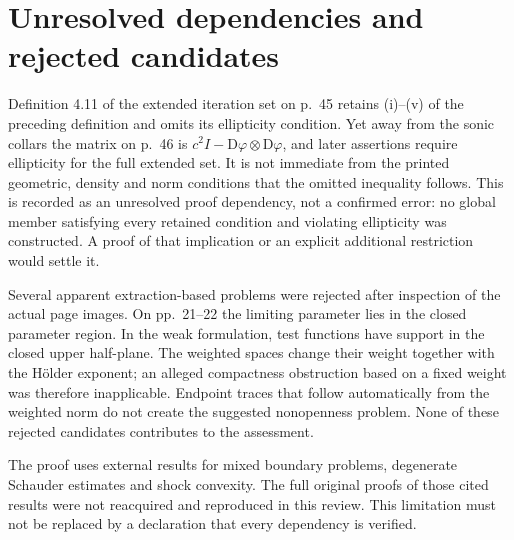 \documentclass[10pt]{article}
\begin{document}
\section*{Unresolved dependencies and rejected candidates}
Definition 4.11 of the extended iteration set on p. 45 retains (i)–(v) of the preceding definition and omits its ellipticity condition. Yet away from the sonic collars the matrix on p. 46 is \(c^2I-\mathrm D\varphi\otimes\mathrm D\varphi\), and later assertions require ellipticity for the full extended set. It is not immediate from the printed geometric, density and norm conditions that the omitted inequality follows. This is recorded as an unresolved proof dependency, not a confirmed error: no global member satisfying every retained condition and violating ellipticity was constructed. A proof of that implication or an explicit additional restriction would settle it.\par
Several apparent extraction-based problems were rejected after inspection of the actual page images. On pp. 21–22 the limiting parameter lies in the closed parameter region. In the weak formulation, test functions have support in the closed upper half-plane. The weighted spaces change their weight together with the Hölder exponent; an alleged compactness obstruction based on a fixed weight was therefore inapplicable. Endpoint traces that follow automatically from the weighted norm do not create the suggested nonopenness problem. None of these rejected candidates contributes to the assessment.\par
The proof uses external results for mixed boundary problems, degenerate Schauder estimates and shock convexity. The full original proofs of those cited results were not reacquired and reproduced in this review. This limitation must not be replaced by a declaration that every dependency is verified.\par
\end{document}
